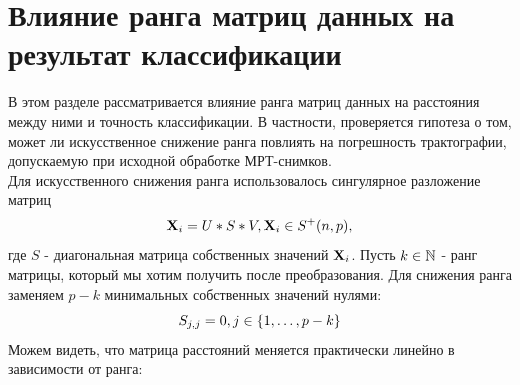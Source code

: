 \section{Влияние ранга матриц данных на результат классификации}
\indent В этом разделе рассматривается влияние ранга матриц данных на расстояния между ними и точность классификации. В частности, проверяется гипотеза о том, может ли искусственное снижение ранга повлиять на погрешность трактографии, допускаемую при исходной обработке МРТ-снимков.\\
\indent Для искусственного снижения ранга использовалось сингулярное разложение матриц $${\bf X}_i = U*S*V, {\bf X}_i \in S^+(n,p),$$ где $S$ - диагональная матрица собственных значений ${\bf X}_i$. Пусть $k \in \mathbb{N}$ - ранг матрицы, который мы хотим получить после преобразования. Для снижения ранга заменяем $p-k$ минимальных собственных значений нулями: $$ S_{j,j} = 0, j \in \left\{ 1, \ldots, p-k \right\} $$
Можем видеть, что матрица расстояний меняется практически линейно в зависимости от ранга:
